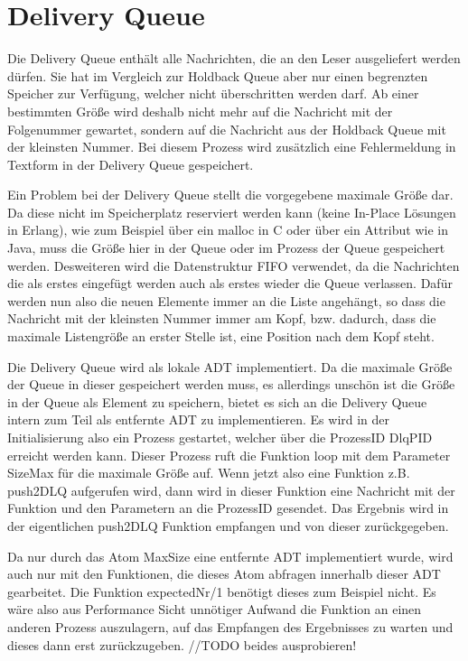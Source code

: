 \section{Delivery Queue}

Die Delivery Queue enthält alle Nachrichten, die an den Leser ausgeliefert werden dürfen. Sie hat im Vergleich zur Holdback Queue aber nur einen begrenzten Speicher zur Verfügung, welcher nicht überschritten werden darf. Ab einer bestimmten Größe wird deshalb nicht mehr auf die Nachricht mit der Folgenummer gewartet, sondern auf die Nachricht aus der Holdback Queue mit der kleinsten Nummer. Bei diesem Prozess wird zusätzlich eine Fehlermeldung in Textform in der Delivery Queue gespeichert. 

Ein Problem bei der Delivery Queue stellt die vorgegebene maximale Größe dar. Da diese nicht im Speicherplatz reserviert werden kann (keine In-Place Lösungen in Erlang), wie zum Beispiel über ein malloc in C oder über ein Attribut wie in Java, muss die Größe hier in der Queue oder im Prozess der Queue gespeichert werden. 
Desweiteren wird die Datenstruktur FIFO verwendet, da die Nachrichten die als erstes eingefügt werden auch als erstes wieder die Queue verlassen. Dafür werden nun also die neuen Elemente immer an die Liste angehängt, so dass die Nachricht mit der kleinsten Nummer immer am Kopf, bzw. dadurch, dass die maximale Listengröße an erster Stelle ist, eine Position nach dem Kopf steht. 

Die Delivery Queue wird als lokale ADT implementiert. Da die maximale Größe der Queue in dieser gespeichert werden muss, es allerdings unschön ist die Größe in der Queue als Element zu speichern, bietet es sich an die Delivery Queue intern zum Teil als entfernte ADT zu implementieren. 
Es wird in der Initialisierung also ein Prozess gestartet, welcher über die ProzessID DlqPID erreicht werden kann. 
Dieser Prozess ruft die Funktion loop mit dem Parameter SizeMax für die maximale Größe auf. 
Wenn jetzt also eine Funktion z.B. push2DLQ aufgerufen wird, dann wird in dieser Funktion eine Nachricht mit der Funktion und den Parametern an die ProzessID gesendet. 
Das Ergebnis wird in der eigentlichen push2DLQ Funktion empfangen und von dieser zurückgegeben. 

Da nur durch das Atom MaxSize eine entfernte ADT implementiert wurde, wird auch nur mit den Funktionen, die dieses Atom abfragen innerhalb dieser ADT gearbeitet. 
Die Funktion expectedNr/1 benötigt dieses zum Beispiel nicht. Es wäre also aus Performance Sicht unnötiger Aufwand die Funktion an einen anderen Prozess auszulagern, auf das Empfangen des Ergebnisses zu warten und dieses dann erst zurückzugeben. 
//TODO beides ausprobieren!

